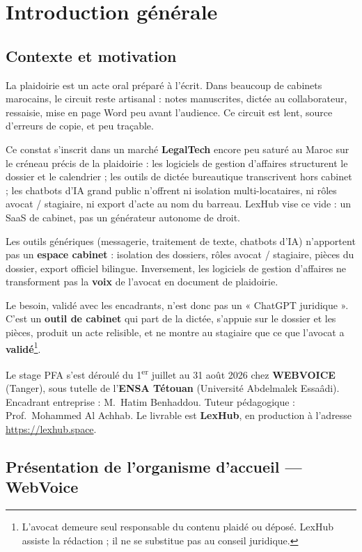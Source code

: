 \chapter{Introduction générale}
\label{ch:intro}

\section{Contexte et motivation}

La plaidoirie est un acte oral préparé à l'écrit. Dans beaucoup de cabinets marocains, le circuit reste artisanal : notes manuscrites, dictée au collaborateur, ressaisie, mise en page Word peu avant l'audience. Ce circuit est lent, source d'erreurs de copie, et peu traçable.

Ce constat s'inscrit dans un marché \textbf{LegalTech} encore peu saturé au Maroc sur le créneau précis de la plaidoirie : les logiciels de gestion d'affaires structurent le dossier et le calendrier ; les outils de dictée bureautique transcrivent hors cabinet ; les chatbots d'IA grand public n'offrent ni isolation multi-locataires, ni rôles avocat / stagiaire, ni export d'acte au nom du barreau. LexHub vise ce vide : un SaaS de cabinet, pas un générateur autonome de droit.

Les outils génériques (messagerie, traitement de texte, chatbots d'IA) n'apportent pas un \textbf{espace cabinet} : isolation des dossiers, rôles avocat / stagiaire, pièces du dossier, export officiel bilingue. Inversement, les logiciels de gestion d'affaires ne transforment pas la \textbf{voix} de l'avocat en document de plaidoirie.

Le besoin, validé avec les encadrants, n'est donc pas un « ChatGPT juridique ». C'est un \textbf{outil de cabinet} qui part de la dictée, s'appuie sur le dossier et les pièces, produit un acte relisible, et ne montre au stagiaire que ce que l'avocat a \textbf{validé}\footnote{L'avocat demeure seul responsable du contenu plaidé ou déposé. LexHub assiste la rédaction ; il ne se substitue pas au conseil juridique.}.

Le stage PFA s'est déroulé du 1\textsuperscript{er} juillet au 31 août 2026 chez \textbf{WEBVOICE} (Tanger), sous tutelle de l'\textbf{ENSA Tétouan} (Université Abdelmalek Essaâdi). Encadrant entreprise : M.~Hatim Benhaddou. Tuteur pédagogique : Prof.~Mohammed Al Achhab. Le livrable est \textbf{LexHub}, en production à l'adresse \url{https://lexhub.space}.

\section{Présentation de l'organisme d'accueil --- WebVoice}
\label{sec:webvoice}


